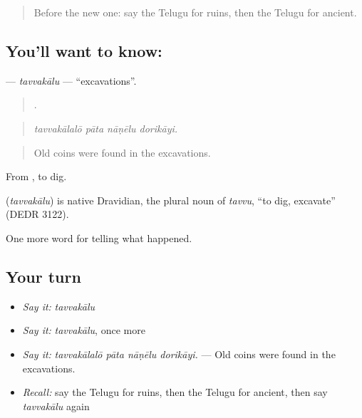 \label{lesson:TE-C367-tavvakalu}



\begin{quote}
Before the new one: say the Telugu for ruins, then the Telugu for ancient.
\end{quote}

\subsection*{You'll want to know: }
\textbf{} — \emph{tavvakālu} — \textquotedblleft{}excavations\textquotedblright{}.

\begin{quote}
   .
\end{quote}

\begin{quote}
\emph{tavvakālalō pāta nāṇēlu dorikāyi.}
\end{quote}

\begin{quote}
Old coins were found in the excavations.
\end{quote}

From , to dig.

\begin{cousinweb}
\textbf{} (\emph{tavvakālu}) is native Dravidian, the plural noun of \emph{tavvu}, \textquotedblleft{}to dig, excavate\textquotedblright{} (DEDR 3122).
\end{cousinweb}

\begin{grammarlens}[title={What you've built}]
One more word for telling what happened.
\end{grammarlens}

\subsection*{Your turn}
\begin{itemize}
\raggedright
  \item \emph{Say it:} \emph{tavvakālu}
  \item \emph{Say it:} \emph{tavvakālu}, once more
  \item \emph{Say it:} \emph{tavvakālalō pāta nāṇēlu dorikāyi.} — Old coins were found in the excavations.
  \item \emph{Recall:} say the Telugu for ruins, then the Telugu for ancient, then say \emph{tavvakālu} again
\end{itemize}

